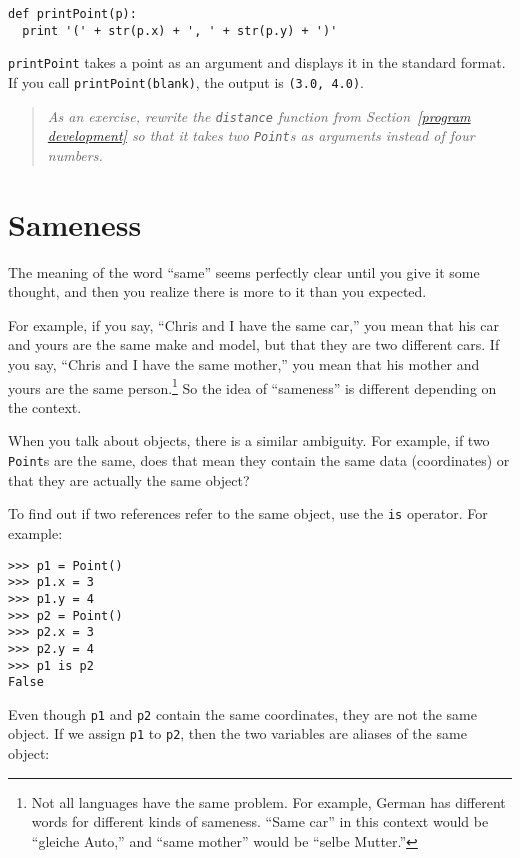 \beforeverb
\begin{verbatim}
def printPoint(p):
  print '(' + str(p.x) + ', ' + str(p.y) + ')'
\end{verbatim}
\afterverb
%
{\tt printPoint} takes a point as an argument and displays it in
the standard format.  If you call {\tt printPoint(blank)}, the
output is {\tt (3.0, 4.0)}.

\begin{quote}
{\em As an exercise, rewrite the {\tt distance} function from
Section~\ref{program development} so that it takes two {\tt Point}s as
arguments instead of four numbers.}
\end{quote}


\section{Sameness}

The meaning of the word ``same'' seems perfectly clear until you give
it some thought, and then you realize there is more to it than you
expected.


For example, if you say, ``Chris and I have the same car,'' you mean
that his car and yours are the same make and model, but that they are
two different cars.  If you say, ``Chris and I have the same mother,''
you mean that his mother and yours are the same person.\footnote{Not all
languages have the same problem.  For example, German has different
words for different kinds of sameness.  ``Same car'' in this context
would be ``gleiche Auto,'' and ``same mother'' would be ``selbe
Mutter.''}  So the idea of ``sameness'' is different depending on the
context.

When you talk about objects, there is a similar ambiguity.  For
example, if two {\tt Point}s are the same, does that mean they
contain the same data (coordinates) or that they are actually
the same object?

To find out if two references refer to the same object, use
the {\tt is} operator.  For example:

\beforeverb
\begin{verbatim}
>>> p1 = Point()
>>> p1.x = 3
>>> p1.y = 4
>>> p2 = Point()
>>> p2.x = 3
>>> p2.y = 4
>>> p1 is p2
False
\end{verbatim}
\afterverb
%
Even though {\tt p1} and {\tt p2} contain the same coordinates,
they are not the same object.  If we assign {\tt p1} to
{\tt p2}, then the two variables are aliases of the same
object:

